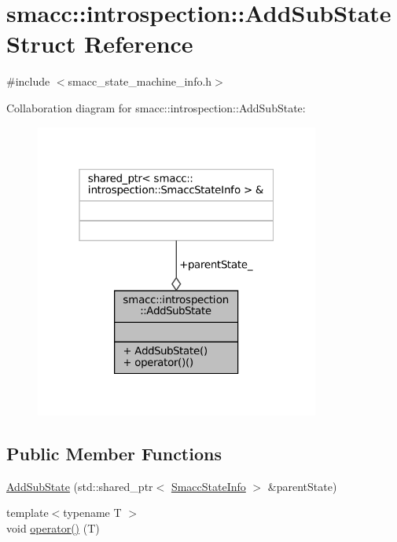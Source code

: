 \hypertarget{structsmacc_1_1introspection_1_1AddSubState}{}\section{smacc\+:\+:introspection\+:\+:Add\+Sub\+State Struct Reference}
\label{structsmacc_1_1introspection_1_1AddSubState}


{\ttfamily \#include $<$smacc\+\_\+state\+\_\+machine\+\_\+info.\+h$>$}



Collaboration diagram for smacc\+:\+:introspection\+:\+:Add\+Sub\+State\+:
\nopagebreak
\begin{figure}[H]
\begin{center}
\leavevmode
\includegraphics[width=265pt]{structsmacc_1_1introspection_1_1AddSubState__coll__graph}
\end{center}
\end{figure}
\subsection*{Public Member Functions}
\begin{DoxyCompactItemize}
\item 
\hyperlink{structsmacc_1_1introspection_1_1AddSubState_a9556919fdfce601d7746c8f3efcf298b}{Add\+Sub\+State} (std\+::shared\+\_\+ptr$<$ \hyperlink{classsmacc_1_1introspection_1_1SmaccStateInfo}{Smacc\+State\+Info} $>$ \&parent\+State)
\item 
{\footnotesize template$<$typename T $>$ }\\void \hyperlink{structsmacc_1_1introspection_1_1AddSubState_aa7c4d53de4a64ef0873bde700ed7317f}{operator()} (T)
\end{DoxyCompactItemize}
